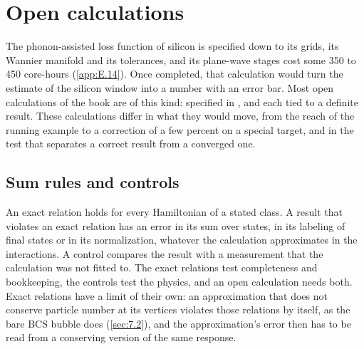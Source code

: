 \section{Open calculations}\label{sec:22.1}

The phonon-assisted loss function of silicon is specified down to its grids, its Wannier manifold and its tolerances, and its plane-wave stages cost some 350 to 450 core-hours (\cref{app:E.14}). Once completed, that calculation would turn the estimate of the silicon window into a number with an error bar. Most open calculations of the book are of this kind: specified in , and each tied to a definite result. These calculations differ in what they would move, from the reach of the running example to a correction of a few percent on a special target, and in the test that separates a correct result from a converged one.

\subsection{Sum rules and controls}\label{sec:22.1-checks}

An exact relation holds for every Hamiltonian of a stated class. A result that violates an exact relation has an error in its sum over states, in its labeling of final states or in its normalization, whatever the calculation approximates in the interactions. A control compares the result with a measurement that the calculation was not fitted to. The exact relations test completeness and bookkeeping, the controls test the physics, and an open calculation needs both. Exact relations have a limit of their own: an approximation that does not conserve particle number at its vertices violates those relations by itself, as the bare BCS bubble does (\cref{sec:7.2}), and the approximation's error then has to be read from a conserving version of the same response.

